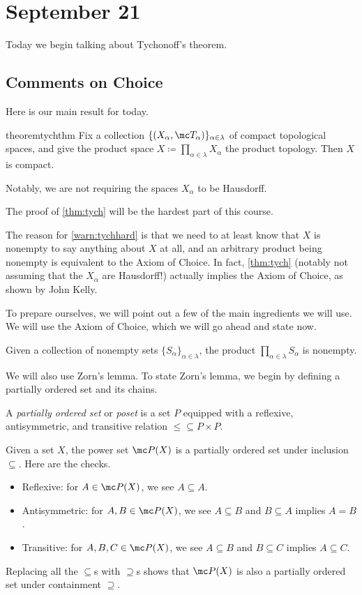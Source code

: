 \documentclass[../notes.tex]{subfiles}
\begin{document}
\section{September 21}

Today we begin talking about Tychonoff's theorem.

\subsection{Comments on Choice}
Here is our main result for today.
\begin{restatable}[Tychonoff]{theorem}{tychthm} \label{thm:tych}
	Fix a collection $\{(X_\alpha,\mc T_\alpha)\}_{\alpha\in\lambda}$ of compact topological spaces, and give the product space $X\coloneqq\prod_{\alpha\in\lambda}X_\alpha$ the product topology. Then $X$ is compact.
\end{restatable}
Notably, we are not requiring the spaces $X_\alpha$ to be Hausdorff.
\begin{warn} \label{warn:tychhard}
	The proof of \autoref{thm:tych} will be the hardest part of this course.
\end{warn}
\begin{remark}
	The reason for \autoref{warn:tychhard} is that we need to at least know that $X$ is nonempty to say anything about $X$ at all, and an arbitrary product being nonempty is equivalent to the Axiom of Choice. In fact, \autoref{thm:tych} (notably not assuming that the $X_\alpha$ are Hausdorff!) actually implies the Axiom of Choice, as shown by John Kelly.
\end{remark}
To prepare ourselves, we will point out a few of the main ingredients we will use. We will use the Axiom of Choice, which we will go ahead and state now.
\begin{ax}[Choice]
	Given a collection of nonempty sets $\{S_\alpha\}_{\alpha\in\lambda}$, the product $\prod_{\alpha\in\lambda}S_\alpha$ is nonempty.
\end{ax}
We will also use Zorn's lemma. To state Zorn's lemma, we begin by defining a partially ordered set and its chains.
\begin{definition}[Poset]
	A \textit{partially ordered set} or \textit{poset} is a set $P$ equipped with a reflexive, antisymmetric, and transitive relation ${\le}\subseteq P\times P$.
\end{definition}
\begin{example} \label{ex:subsetsposet}
	Given a set $X$, the power set $\mc P(X)$ is a partially ordered set under inclusion $\subseteq$. Here are the checks.
	\begin{itemize}
		\item Reflexive: for $A\in\mc P(X)$, we see $A\subseteq A$.
		\item Antisymmetric: for $A,B\in\mc P(X)$, we see $A\subseteq B$ and $B\subseteq A$ implies $A=B$.
		\item Transitive: for $A,B,C\in\mc P(X)$, we see $A\subseteq B$ and $B\subseteq C$ implies $A\subseteq C$.
	\end{itemize}
	Replacing all the $\subseteq$s with $\supseteq$s shows that $\mc P(X)$ is also a partially ordered set under containment $\supseteq$.
\end{example}
\end{document}
